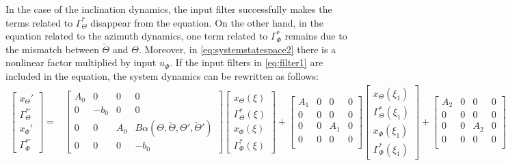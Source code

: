 \documentclass[../main.tex]{subfiles}
\begin{document}
	In the case of the inclination dynamics, the input filter successfully makes the terms related to $\Gamma_\Theta^*$ disappear from the equation. On the other hand, in the equation related to the azimuth dynamics, one term related to $\Gamma_\Phi^*$ remains due to the mismatch between $\check{\Theta}$ and $\Theta$. Moreover, in \eqref{eq:systemstatespace2} there is a nonlinear factor multiplied by input $u_\Phi$. If the input filters in \eqref{eq:filter1} are included in the equation, the system dynamics can be rewritten as follows:
	\begin{align}
	\begin{bmatrix}
	x_\Theta' \\
	\Gamma_\Theta^{*'} \\
	x_\Phi' \\
	\Gamma_\Phi^{*'} 
	\end{bmatrix} =&
	\begin{bmatrix}
	A_0 & 0 & 0 & 0\\
	0 & -b_0 & 0 & 0 \\
	0 & 0 & A_0 & B\alpha(\Theta,\check{\Theta},\Theta',\check{\Theta}') \\
	0 & 0 & 0 & -b_0
	\end{bmatrix}
	\begin{bmatrix}
	x_\Theta(\xi) \\
	\Gamma_\Theta^{*}(\xi) \\
	x_\Phi(\xi) \\
	\Gamma_\Phi^{*} (\xi)
	\end{bmatrix} + 
	\begin{bmatrix}
	A_1 & 0 & 0 & 0\\
	0 & 0 & 0 & 0 \\
	0 & 0 & A_1 & 0 \\
	0 & 0 & 0 & 0 \\
	\end{bmatrix}
	\begin{bmatrix}
	x_\Theta(\xi_1) \\
	\Gamma_\Theta^{*}(\xi_1) \\
	x_\Phi(\xi_1) \\
	\Gamma_\Phi^{*} (\xi_1)
	\end{bmatrix} +
	\begin{bmatrix}
	A_2 & 0 & 0 & 0 \\
	0 & 0 & 0 & 0 \\
	0 & 0 & A_2 & 0 \\
	0 & 0 & 0 & 0 \\
	\end{bmatrix}

\end{align}
\end{document}
